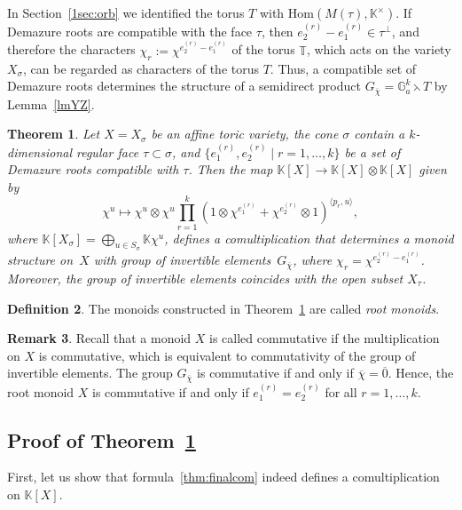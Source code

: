 \documentclass[a4paper, 11pt]{amsart}
\theoremstyle{plain}
\newtheorem{theorem}{Theorem}[section]
\theoremstyle{remark}
\theoremstyle{definition}
\newtheorem{definition}[theorem]{Definition}
\newtheorem{remark}[theorem]{Remark}
\newcommand{\KK}{\mathbb{K}}
\newcommand{\G}{\mathbb{G}}
\newcommand{\GG}{G_{\overline{\chi}}}
\newcommand{\TT}{\mathbb{T}}
\newcommand{\ol}[1]{\overline{#1}}
\begin{document}
In Section~\ref{1sec:orb} we identified the torus $T$ with $\text{Hom}(M(\tau), \KK^\times)$. If Demazure roots are compatible with the face $\tau$, then $e_2^{(r)} - e_1^{(r)} \in \tau^\perp$, and therefore the characters $\chi_r := \chi^{e_2^{(r)} - e_1^{(r)}}$ of the torus $\TT$, which acts on the variety $X_\sigma$, can be regarded as characters of the torus $T$. Thus, a compatible set of Demazure roots determines the structure of a semidirect product $\GG = \G_a^k \leftthreetimes T$ by Lemma~\ref{lmYZ}. 

\begin{theorem}\label{thm:mon}
Let $X = X_\sigma$ be an affine toric variety, the cone $\sigma$ contain a $k$-dimensional regular face $\tau \subset \sigma$, and $\{e_1^{(r)}, e_2^{(r)} \mid r = 1,\ldots,k\}$ be a set of Demazure roots compatible with $\tau$. Then the map $\KK[X] \rightarrow \KK[X] \otimes \KK[X]$ given by
\begin{equation}\label{thm:finalcom}
	\chi^u \mapsto \chi^u \otimes \chi^u \prod_{r = 1}^{k} (1 \otimes \chi^{e_1^{(r)}} + \chi^{e_2^{(r)}} \otimes 1)^{\langle p_r, u\rangle},
\end{equation}
where $\KK[X_\sigma] = \bigoplus_{u \in S_\sigma} \KK \chi^u$, defines a comultiplication that determines a monoid structure on~$X$ with group of invertible elements~$\GG$, where $\chi_r = \chi^{e_2^{(r)} - e_1^{(r)}}$. Moreover, the group of invertible elements coincides with the open subset $X_\tau$.
\end{theorem}

\begin{definition}
The monoids constructed in Theorem~\ref{thm:mon} are called \textit{root monoids}.
\end{definition}
 
\begin{remark}
Recall that a monoid $X$ is called commutative if the multiplication on $X$ is commutative, which is equivalent to commutativity of the group of invertible elements. The group $\GG$ is commutative if and only if $\ol{\chi} = \ol{0}$. Hence, the root monoid $X$ is commutative if and only if $e_1^{(r)} = e_2^{(r)}$ for all $r = 1, \ldots, k.$
\end{remark}


\subsection{Proof of Theorem~\ref{thm:mon}}

First, let us show that formula~\eqref{thm:finalcom} indeed defines a comultiplication on $\KK[X]$.
\end{document}
